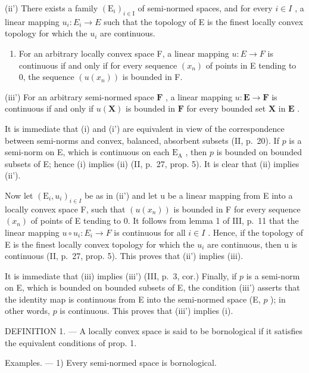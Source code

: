 (ii') There exists a family \((\mathrm{E}_{i})_{i\in\mathrm{I}}\) of semi-normed spaces, and for every \(i\in I\) , a linear mapping \(u_{i}:E_{i}\to E\) such that the topology of E is the finest locally convex topology for which the \(u_{i}\) are continuous.

\begin{enumerate}
\def\labelenumi{(\roman{enumi})}
\setcounter{enumi}{2}
\tightlist
\item
  For an arbitrary locally convex space F, a linear mapping \(u: E \to F\) is continuous if and only if for every sequence \((x_{n})\) of points in E tending to 0, the sequence \((u(x_{n}))\) is bounded in F.
\end{enumerate}

(iii') For an arbitrary semi-normed space \(\mathbf{F}\) , a linear mapping \(u: \mathbf{E} \to \mathbf{F}\) is continuous if and only if \(u(\mathbf{X})\) is bounded in \(\mathbf{F}\) for every bounded set \(\mathbf{X}\) in \(\mathbf{E}\) .

It is immediate that (i) and (i') are equivalent in view of the correspondence between semi-norms and convex, balanced, absorbent subsets (II, p.~20). If \(p\) is a semi-norm on E, which is continuous on each \(\mathrm{E}_{\mathrm{A}}\) , then \(p\) is bounded on bounded subsets of E; hence (i) implies (ii) (II, p.~27, prop. 5). It is clear that (ii) implies (ii').

Now let \((\mathrm{E}_{i}, u_{i})_{i\in I}\) be as in (ii') and let u be a linear mapping from E into a locally convex space F, such that \((u(x_{n}))\) is bounded in F for every sequence \((x_{n})\) of points of E tending to 0. It follows from lemma 1 of III, p.~11 that the linear mapping \(u\circ u_{i}:E_{i}\to F\) is continuous for all \(i\in I\) . Hence, if the topology of E is the finest locally convex topology for which the \(u_{i}\) are continuous, then u is continuous (II, p.~27, prop. 5). This proves that (ii') implies (iii).

It is immediate that (iii) implies (iii') (III, p.~3, cor.) Finally, if \(p\) is a semi-norm on E, which is bounded on bounded subsets of E, the condition (iii') asserts that the identity map is continuous from E into the semi-normed space (E, \(p\) ); in other words, \(p\) is continuous. This proves that (iii') implies (i).

DEFINITION 1. --- A locally convex space is said to be bornological if it satisfies the equivalent conditions of prop. 1.

Examples. --- 1) Every semi-normed space is bornological.

